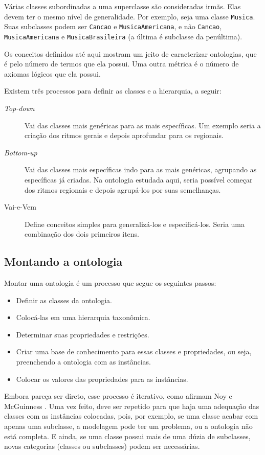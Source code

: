 Várias classes subordinadas a uma superclasse são consideradas irmãs. Elas devem ter o mesmo nível de generalidade. Por exemplo, seja uma classe \texttt{Musica}. Suas subclasses podem ser \texttt{Cancao} e \texttt{MusicaAmericana}, e não \texttt{Cancao}, \texttt{MusicaAmericana} e \texttt{MusicaBrasileira} (a última é subclasse da penúltima).

Os conceitos definidos até aqui mostram um jeito de caracterizar ontologias, que é pelo número de termos que ela possui. Uma outra métrica é o número de axiomas lógicos que ela possui. 

Existem três processos para definir as classes e a hierarquia, a seguir:

\begin{description}
	\item[\textit{Top-down}] Vai das classes mais genéricas para as mais específicas. Um exemplo seria a criação dos ritmos gerais e depois aprofundar para os regionais.
	\item[\textit{Bottom-up}] Vai das classes mais específicas indo para as mais genéricas, agrupando as específicas já criadas. Na ontologia estudada aqui, seria possível começar dos ritmos regionais e depois agrupá-los por suas semelhanças.
	\item[Vai-e-Vem] Define conceitos simples para generalizá-los e especificá-los. Seria uma combinação dos dois primeiros itens.
\end{description}

\subsection{Montando a ontologia}

Montar uma ontologia é um processo que segue os seguintes passos:

\begin{itemize}
	\item Definir as classes da ontologia.
	\item Colocá-las em uma hierarquia taxonômica.
	\item Determinar suas propriedades e restrições.
	\item Criar uma base de conhecimento para essas classes e propriedades, ou seja, preenchendo a ontologia com as instâncias.
	\item Colocar os valores das propriedades para as instâncias.
\end{itemize}

Embora pareça ser direto, esse processo é iterativo, como afirmam Noy e McGuinness \cite{ontoNoy}. Uma vez feito, deve ser repetido para que haja uma adequação das classes com as instâncias colocadas, pois, por exemplo, se uma classe acabar com apenas uma subclasse, a modelagem pode ter um problema, ou a ontologia não está completa. E ainda, se uma classe possui mais de uma dúzia de subclasses, novas categorias (classes ou subclasses) podem ser necessárias. 

